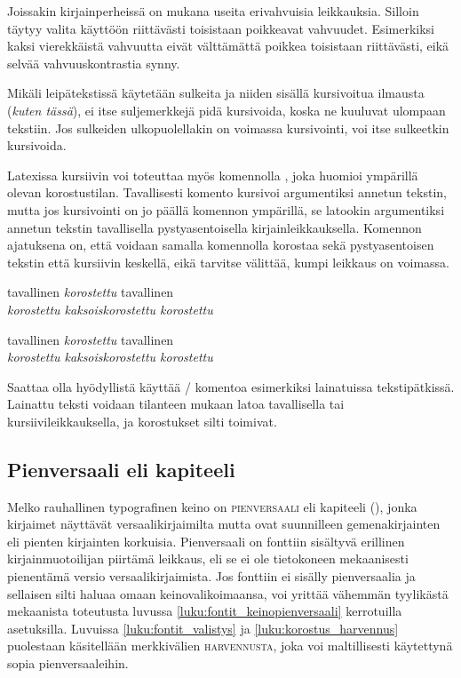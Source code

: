 Joissakin kirjainperheissä on mukana useita erivahvuisia leikkauksia.
Silloin täytyy valita käyttöön riittävästi toisistaan poikkeavat
vahvuudet. Esimerkiksi kaksi vierekkäistä vahvuutta eivät välttämättä
poikkea toisistaan riittävästi, eikä selvää vahvuuskontrastia synny.

Mikäli leipätekstissä käytetään sulkeita ja niiden sisällä kursivoitua
ilmausta (\textit{kuten tässä}), ei itse suljemerkkejä pidä kursivoida,
koska ne kuuluvat ulompaan tekstiin. Jos sulkeiden ulkopuolellakin on
voimassa kursivointi, voi itse sulkeetkin kursivoida.

Latexissa kursiivin voi toteuttaa myös komennolla , joka
huomioi ympärillä olevan korostustilan. Tavallisesti komento kursivoi
argumentiksi annetun tekstin, mutta jos kursivointi on jo päällä
komennon ympärillä, se latookin argumentiksi annetun tekstin
tavallisella pystyasentoisella kirjainleikkauksella. Komennon ajatuksena
on, että voidaan samalla komennolla korostaa sekä pystyasentoisen
tekstin että kursiivin keskellä, eikä tarvitse välittää, kumpi leikkaus
on voimassa.

\begin{koodilohkosis}
tavallinen \emph{korostettu} tavallinen \\
\emph{korostettu \emph{kaksoiskorostettu} korostettu}
\end{koodilohkosis}

\begin{tulossis}
  tavallinen \emph{korostettu} tavallinen \\
  \emph{korostettu \emph{kaksoiskorostettu} korostettu}
\end{tulossis}

Saattaa olla hyödyllistä käyttää \-/ komentoa esimerkiksi
lainatuissa tekstipätkissä. Lainattu teksti voidaan tilanteen mukaan
latoa tavallisella tai kursiivileikkauksella, ja korostukset silti
toimivat.

\subsection{Pienversaali eli kapiteeli}
\label{luku:korostus_pienversaali}

Melko rauhallinen typografinen keino on \textsc{pienversaali} eli
kapiteeli (), jonka kirjaimet näyttävät
versaalikirjaimilta mutta ovat suunnilleen gemenakirjainten eli pienten
kirjainten korkuisia. Pienversaali on fonttiin sisältyvä erillinen
kirjainmuotoilijan piirtämä leikkaus, eli se ei ole tietokoneen
mekaanisesti pienentämä versio versaalikirjaimista. Jos fonttiin ei
sisälly pienversaalia ja sellaisen silti haluaa omaan
keinovalikoimaansa, voi yrittää vähemmän tyylikästä mekaanista
toteutusta luvussa \ref{luku:fontit_keinopienversaali} kerrotuilla
asetuksilla. Luvuissa \ref{luku:fontit_valistys} ja
\ref{luku:korostus_harvennus} puolestaan käsitellään merkkivälien
{\scshape{} harvennusta}, joka voi
maltillisesti käytettynä sopia pienversaaleihin.

